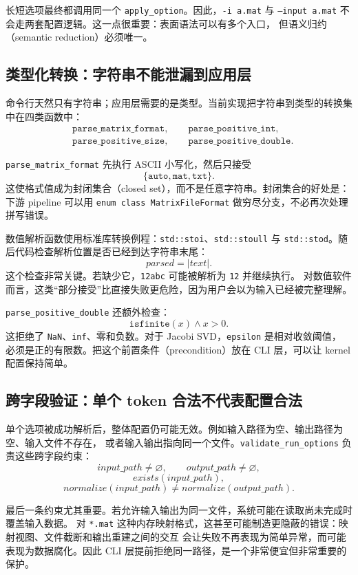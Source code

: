 长短选项最终都调用同一个 \texttt{apply\_option}。因此，\texttt{-i a.mat} 与
\texttt{--input a.mat} 不会走两套配置逻辑。这一点很重要：表面语法可以有多个入口，
但语义归约（semantic reduction）必须唯一。

\subsection{类型化转换：字符串不能泄漏到应用层}

命令行天然只有字符串；应用层需要的是类型。当前实现把字符串到类型的转换集中在四类函数中：
\[
\begin{aligned}
    &\texttt{parse\_matrix\_format},\qquad
      \texttt{parse\_positive\_int},\\
    &\texttt{parse\_positive\_size},\qquad
      \texttt{parse\_positive\_double}.
\end{aligned}
\]

\texttt{parse\_matrix\_format} 先执行 ASCII 小写化，然后只接受
\[
    \{\texttt{auto},\texttt{mat},\texttt{txt}\}.
\]
这使格式值成为封闭集合（closed set），而不是任意字符串。封闭集合的好处是：
下游 pipeline 可以用 \texttt{enum class MatrixFileFormat} 做穷尽分支，不必再次处理拼写错误。

数值解析函数使用标准库转换例程：\texttt{std::stoi}、\texttt{std::stoull} 与
\texttt{std::stod}。随后代码检查解析位置是否已经到达字符串末尾：
\[
    parsed = |text|.
\]
这个检查非常关键。若缺少它，\texttt{12abc} 可能被解析为 \texttt{12} 并继续执行。
对数值软件而言，这类“部分接受”比直接失败更危险，因为用户会以为输入已经被完整理解。

\texttt{parse\_positive\_double} 还额外检查：
\[
    \texttt{isfinite}(x)\land x>0.
\]
这拒绝了 \texttt{NaN}、\texttt{inf}、零和负数。对于 Jacobi SVD，\texttt{epsilon} 是相对收敛阈值，
必须是正的有限数。把这个前置条件（precondition）放在 CLI 层，可以让 kernel 配置保持简单。

\subsection{跨字段验证：单个 token 合法不代表配置合法}

单个选项被成功解析后，整体配置仍可能无效。例如输入路径为空、输出路径为空、输入文件不存在，
或者输入输出指向同一个文件。\texttt{validate\_run\_options} 负责这些跨字段约束：
\[
    input\_path\ne\varnothing,\qquad
    output\_path\ne\varnothing,
\]
\[
    exists(input\_path),
\]
\[
    normalize(input\_path)\ne normalize(output\_path).
\]

最后一条约束尤其重要。若允许输入输出为同一文件，系统可能在读取尚未完成时覆盖输入数据。
对 \texttt{*.mat} 这种内存映射格式，这甚至可能制造更隐蔽的错误：映射视图、文件截断和输出重建之间的交互
会让失败不再表现为简单异常，而可能表现为数据腐化。因此 CLI 层提前拒绝同一路径，是一个非常便宜但非常重要的保护。

